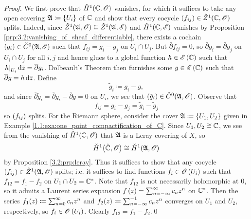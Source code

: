 \documentclass[../Moduli_Spaces_of_Riemann_Surfaces.tex]{subfiles}
\begin{document}
    \begin{proof}
        We first prove that $\check{H}^1\!\left(\mathbb{C},\mathscr{O}\right)$ vanishes, for which it suffices to take any open covering $\mathfrak{A}\coloneqq\left\{U_i\right\}$ of $\mathbb{C}$ and show that every cocycle $\left(f_{ij}\right)\in\check{Z}^1\!\left(\mathbb{C},\mathscr{O}\right)$ splits. Indeed, since $\check{Z}^1\!\left(\mathfrak{A},\mathscr{O}\right)\subseteq\check{Z}^1\!\left(\mathfrak{A},\mathscr{E}\right)$ and $\check{H}^1\!\left(\mathbb{C},\mathscr{E}\right)$ vanishes by Proposition \ref{prp:3.2:vanishing_of_sheaf_differentiable}, there exists a cochain $\left(g_i\right)\in\check{C}^0\!\left(\mathfrak{A},\mathscr{E}\right)$ such that $f_{ij}=g_i-g_j$ on $U_i\cap U_j$. But $\bar{\partial}f_{ij}=0$, so $\bar{\partial}g_i=\bar{\partial}g_j$ on $U_i\cap U_j$ for all $i,j$ and hence glues to a global function $h\in\mathscr{E}\left(\mathbb{C}\right)$ such that $\left.h\right|_{U_i}\mathrm{d}\overline{z}=\overline{\partial}g_i$. Dolbeault's Theorem then furnishes some $g\in\mathscr{E}\left(\mathbb{C}\right)$ such that $\overline{\partial}g=h\,\mathrm{d}\overline{z}$. Define
        \begin{equation*}
            \tilde{g}_i\coloneqq g_i-g,
        \end{equation*}
        and since $\bar{\partial}\tilde{g}_i=\bar{\partial} g_i-\bar{\partial}g=0$ on $U_i$, we see that $\left(\tilde{g}_i\right)\in\check{C}^0\!\left(\mathfrak{A},\mathscr{O}\right)$. Observe that
        \begin{equation*}
            f_{ij}=g_i-g_j=\tilde{g}_i-\tilde{g}_j
        \end{equation*}
        so $\left(f_{ij}\right)$ splits. For the Riemann sphere, consider the cover $\mathfrak{A}\coloneqq\left\{U_1,U_2\right\}$ given in Example \ref{1.1:exa:one_point_compactification_of_C}. Since $U_1,U_2\cong\mathbb{C}$, we see from the vanishing of $\check{H}^1\!\left(\mathbb{C},\mathscr{O}\right)$ that $\mathfrak{A}$ is a Leray covering of $X$, so
        \begin{equation*}
            \check{H}^1\big(\hat{\mathbb{C}},\mathscr{O}\big)\cong\check{H}^1\!\left(\mathfrak{A},\mathscr{O}\right)
        \end{equation*}
        by Proposition \ref{3.2:prp:leray}. Thus it suffices to show that any cocycle $\left(f_{ij}\right)\in\check{Z}^1\!\left(\mathfrak{A},\mathscr{O}\right)$ splits; i.e. it suffices to find functions $f_i\in\mathscr{O}\left(U_i\right)$ such that $f_{12}=f_1-f_2$ on $U_1\cap U_2=\mathbb{C}^\ast$. Note that $f_{12}$ is not necessarily holomorphic at $0$, so it admits a Laurent series expansion $f\left(z\right)=\sum_{n=-\infty}^{\infty}c_nz^n$ on $\mathbb{C}^\ast$. Then the series $f_1\!\left(z\right)\coloneqq\sum_{n=0}^{\infty}c_nz^n$ and $f_2\!\left(z\right)\coloneqq\sum_{n=-\infty}^{-1}c_nz^n$ converges on $U_1$ and $U_2$, respectively, so $f_i\in\mathscr{O}\left(U_i\right)$. Clearly $f_{12}=f_1-f_2$.\qed
    \end{proof}
\end{document}
